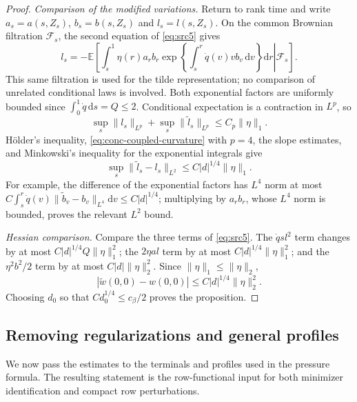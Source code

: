 \documentclass[11pt,a4paper]{article}
\numberwithin{equation}{section}
\theoremstyle{definition}
\theoremstyle{remark}
\newcommand{\E}{\mathbb E}
\newcommand{\dd}{\mathrm d}
\begin{document}
\begin{proof}
\emph{Comparison of the modified variations.}
Return to rank time and write $a_s=a(s,Z_s)$, $b_s=b(s,Z_s)$ and
$l_s=l(s,Z_s)$.  On the common Brownian filtration $\mathcal F_s$, the
second equation of \eqref{eq:src5} gives
\begin{equation}
 l_s=-\E\left[
   \left.\int_s^1\eta(r)a_rb_r
       \exp\left\{\int_s^r\dot q(v)v b_v\,\dd v\right\}\dd r
       \right|\mathcal F_s\right].
 \label{eq:conc-l-representation}
\end{equation}
This same filtration is used for the tilde representation; no comparison
of unrelated conditional laws is involved.  Both exponential factors are
uniformly bounded since $\int_0^1\dot q\,\dd s=Q\leq2$.
Conditional expectation is a contraction in $L^p$, so
\[
 \sup_s\|l_s\|_{L^p}+\sup_s\|\widetilde l_s\|_{L^p}
       \leq C_p\|\eta\|_1.
\]
H\"older's inequality, \eqref{eq:conc-coupled-curvature} with $p=4$,
the slope estimates, and Minkowski's inequality for the exponential
integrals give
\begin{equation}
 \sup_s\|\widetilde l_s-l_s\|_{L^2}
       \leq C|d|^{1/4}\|\eta\|_1.
 \label{eq:conc-l-stability}
\end{equation}
For example, the difference of the exponential factors has $L^4$ norm
at most
$C\int_s^r\dot q(v)\|\widetilde b_v-b_v\|_{L^4}\dd v
\leq C|d|^{1/4}$; multiplying by $a_rb_r$, whose $L^4$ norm is bounded,
proves the relevant $L^2$ bound.

\emph{Hessian comparison.}
Compare the three terms of \eqref{eq:src5}.  The $\dot q s l^2$
term changes by at most $C|d|^{1/4}Q\|\eta\|_1^2$; the $2\eta a l$ term
by at most $C|d|^{1/4}\|\eta\|_1^2$; and the $\eta^2b^2/2$ term by at
most $C|d|\|\eta\|_2^2$.  Since $\|\eta\|_1\leq\|\eta\|_2$,
\begin{equation}
 |\widetilde w(0,0)-w(0,0)|
       \leq C|d|^{1/4}\|\eta\|_2^2.
 \label{eq:conc-hessian-stability}
\end{equation}
Choosing $d_0$ so that $Cd_0^{1/4}\leq c_\beta/2$ proves the proposition.
\end{proof}

\subsection{Removing regularizations and general profiles}

We now pass the estimates to the terminals and profiles used in the
pressure formula.  The resulting statement is the row-functional input
for both minimizer identification and compact row perturbations.
\end{document}
